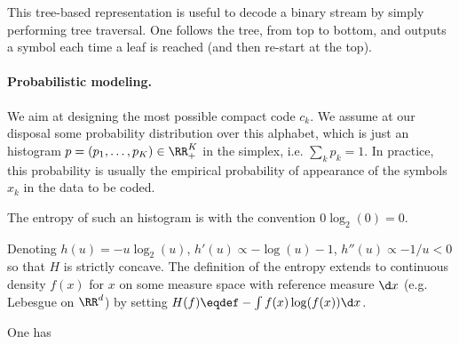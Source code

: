 
This tree-based representation is useful to decode a binary stream by simply performing tree traversal. One follows the tree, from top to bottom, and outputs a symbol each time a leaf is reached (and then re-start at the top). 


\paragraph{Probabilistic modeling.}

We aim at designing the most possible compact code $c_k$. 
%
We assume at our disposal some probability distribution over this alphabet, which is just an histogram $p=(p_1,\ldots,p_K) \in \RR_+^K$ in the simplex, i.e. $\sum_k p_k=1$. 
%
In practice, this probability is usually the empirical probability of appearance of the symbols $x_k$ in the data to be coded. 


The entropy of such an histogram is 
with the convention $0\log_2(0)=0$. 

Denoting $h(u)=-u \log_2(u)$, $h'(u) \propto -\log(u)-1$, $h''(u) \propto -1/u<0$ so that $H$ is strictly concave. The definition of the entropy extends to continuous density $f(x)$ for $x$ on some measure space with reference measure $\d x$ (e.g. Lebesgue on $\RR^d$) by setting $H(f) \eqdef -\int f(x) \log(f(x)) \d x$. 






\begin{lem} One has
\end{lem}


